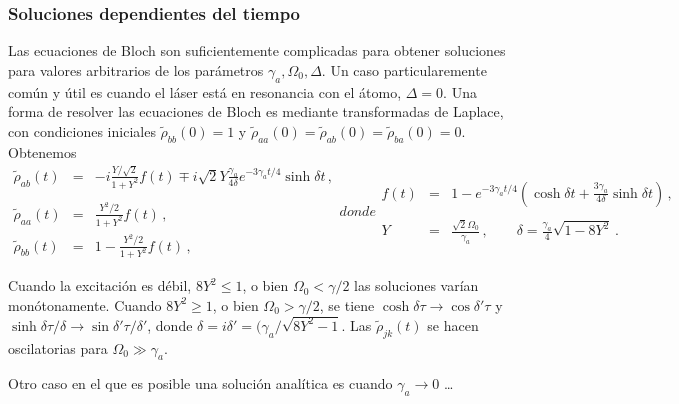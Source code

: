 \documentclass[twocolumn,aps,eqsecnum]{revtex4}
\begin{document}
\subsubsection{Soluciones dependientes del tiempo} 
Las ecuaciones de Bloch son suficientemente complicadas para obtener 
soluciones para valores arbitrarios de los par\'ametros 
$\gamma_a,\Omega_0,\Delta$. Un caso particularemente com\'un y \'util 
es cuando el l\'aser est\'a en resonancia con el \'atomo, $\Delta =0$. Una 
forma de resolver las ecuaciones de Bloch es mediante transformadas de 
Laplace, con condiciones iniciales $\tilde{\rho}_{bb} (0) =1$ y 
$\tilde{\rho}_{aa} (0) = \tilde{\rho}_{ab} (0) = \tilde{\rho}_{ba} (0) = 0$. 
Obtenemos
%
\begin{subequations} 	%
\begin{eqnarray} 	
\tilde{\rho}_{ab}(t) &=& - i \frac{ Y/ \sqrt{2} }{1+Y^2}  f(t)
  \mp i \sqrt{2} Y \frac{\gamma_a}{4 \delta} e^{-3\gamma_a t/4} \sinh{\delta t}	
   \,,  	\nonumber \\   \\
%
\tilde{\rho}_{aa}(t) &=& \frac{ Y^2/2 }{1+ Y^2}  f(t)  \,, 	\\ 
%
\tilde{\rho}_{bb}(t) &=& 1 -\frac{ Y^2/2 }{1+ Y^2}   f(t)  \,, 
\end{eqnarray}
donde
%
\begin{eqnarray}
f(t) &=& 1 -e^{-3\gamma_a t/4} \left( \cosh{\delta t}  
	+ \frac{3 \gamma_a}{4 \delta} \sinh{\delta t} \right) \,, \nonumber \\ \\
Y &=& \frac{ \sqrt{2} \Omega_0 }{\gamma_a} 	\,, \qquad 
	\delta  = \frac{\gamma_a}{4} \sqrt{1 - 8Y^2} \,. 
\end{eqnarray}
\end{subequations} 

Cuando la excitaci\'on es d\'ebil, $ 8Y^2 \leq 1$, o bien 
$\Omega_0 < \gamma /2$ las soluciones var\'ian mon\'otonamente. 
Cuando $ 8Y^2 \geq 1$, o bien $\Omega_0 > \gamma /2$, se tiene 
$\cosh{\delta \tau} \to \cos{\delta' \tau}$ y 
$\sinh{\delta \tau}/\delta \to \sin{\delta' \tau}/\delta'$, donde 
$\delta = i \delta' = (\gamma_a /\sqrt{8Y^2 -1}$. Las $\tilde{\rho}_{jk}(t)$ 
se hacen oscilatorias para $\Omega_0 \gg \gamma_a$. 

Otro caso en el que es posible una soluci\'on anal\'itica es cuando 
$\gamma_a \to 0$ \ldots 

\end{document}
